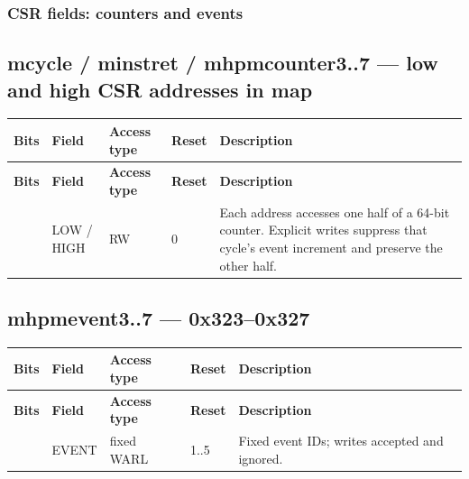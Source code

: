 \documentclass[11pt]{article}
\begin{document}
\subsubsection{CSR fields: counters and events}
\subsection*{mcycle / minstret / mhpmcounter3..7 — low and high CSR addresses in map}
{\small
\begin{longtable}{@{}L{0.1200\dimexpr\linewidth-48pt\relax}L{0.1800\dimexpr\linewidth-48pt\relax}L{0.1200\dimexpr\linewidth-48pt\relax}L{0.1200\dimexpr\linewidth-48pt\relax}L{0.4600\dimexpr\linewidth-48pt\relax}@{}}
\toprule
\textbf{Bits} & \textbf{Field} & \textbf{Access type} & \textbf{Reset} & \textbf{Description} \\ \midrule
\endfirsthead
\toprule
\textbf{Bits} & \textbf{Field} & \textbf{Access type} & \textbf{Reset} & \textbf{Description} \\ \midrule
\endhead
[31:0] & LOW / HIGH & RW & 0 & Each address accesses one half of a 64-bit counter. Explicit writes suppress that cycle’s event increment and preserve the other half. \\*
\bottomrule\end{longtable}}
\subsection*{mhpmevent3..7 — 0x323–0x327}
{\small
\begin{longtable}{@{}L{0.1200\dimexpr\linewidth-48pt\relax}L{0.1800\dimexpr\linewidth-48pt\relax}L{0.1200\dimexpr\linewidth-48pt\relax}L{0.1200\dimexpr\linewidth-48pt\relax}L{0.4600\dimexpr\linewidth-48pt\relax}@{}}
\toprule
\textbf{Bits} & \textbf{Field} & \textbf{Access type} & \textbf{Reset} & \textbf{Description} \\ \midrule
\endfirsthead
\toprule
\textbf{Bits} & \textbf{Field} & \textbf{Access type} & \textbf{Reset} & \textbf{Description} \\ \midrule
\endhead
[31:0] & EVENT & fixed WARL & 1..5 & Fixed event IDs; writes accepted and ignored. \\*
\bottomrule\end{longtable}}
\end{document}
